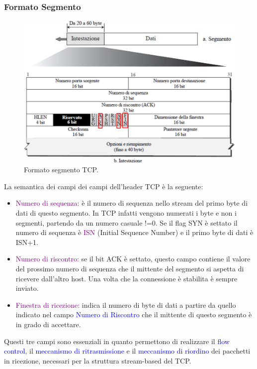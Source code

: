\subsubsection{Formato Segmento}
\begin{figure}[h]
    \centering
    \includegraphics[scale=0.45]{Immagini/FormatoSegmentoTCP.png}
    \caption{Formato segmento TCP.}
\end{figure}

La semantica dei campi dei campi dell'header TCP è la seguente:
\begin{itemize}
    \item \textcolor{purple}{Numero di sequenza:} è il numero di sequenza nello stream del primo byte di dati di questo segmento. In TCP infatti vengono numerati i byte e non i segmenti, partendo da un numero casuale !=0. 
    Se il flag SYN è settato il numero di sequenza è \textcolor{purple}{ISN} (Initial Sequence Number) e il primo byte di dati è ISN+1.
    \item \textcolor{purple}{Numero di riscontro:} se il bit ACK è settato, questo campo contiene il valore del prossimo numero di sequenza che il mittente del segmento si aspetta di ricevere dall’altro host. 
    Una volta che la connessione è stabilita è sempre inviato.
    \item \textcolor{purple}{Finestra di ricezione:}  indica il numero di byte di dati a partire da quello indicato nel campo \textcolor{blue}{Numero di Riscontro} che il mittente di questo segmento è in grado di accettare. 
\end{itemize}

Questi tre campi sono essenziali in quanto permettono di realizzare il \textcolor{blue}{flow control}, il \textcolor{blue}{meccanismo di ritrasmissione} e il \textcolor{blue}{meccanismo di riordino} dei pacchetti in ricezione, necessari per la struttura stream-based del TCP.

